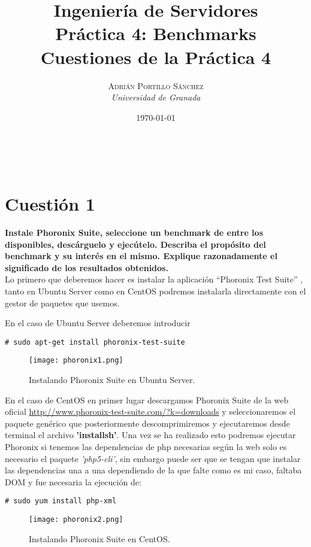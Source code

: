 \documentclass[a4paper, 10pt]{article} %
\title{\textbf{Ingeniería de Servidores\\Práctica 4: Benchmarks}\\ %
\vspace{20 pt}
Cuestiones de la Práctica 4} %
\author{\textsc{Adrián Portillo Sánchez} %
\\{\textit{Universidad de Granada}}} %
\date{\today} %
\makeatletter
\renewcommand{\maketitle}{ %
\begin{center} %
{\Huge\@title} %
\end{center}

\vspace{20pt} %

\begin{flushright} %
{\large\@author} %
\\\@date %

\vspace{40pt} %
\end{flushright}
\renewcommand{\baselinestretch}{0.5}

}
\makeatother
\begin{document}
\thispagestyle{empty}
\maketitle
\pagebreak
\thispagestyle{empty}
\tableofcontents
\pagebreak
\listoffigures
\pagebreak

\section{Cuestión 1}
\textbf{Instale Phoronix Suite, seleccione un benchmark de entre los disponibles, descárguelo y ejecútelo. Describa el propósito del benchmark y su interés en el mismo. Explique razonadamente el significado de los resultados obtenidos.}\\

Lo primero que deberemos hacer es instalar la aplicación “Phoronix Test Suite” \cite{1}, tanto en Ubuntu Server como en CentOS podremos instalarla directamente con el gestor de paquetes que usemos.

En el caso de Ubuntu Server deberemos introducir
\begin{verbatim}
# sudo apt-get install phoronix-test-suite
\end{verbatim}

\begin{figure}[H]
\centering 
\texttt{[image: phoronix1.png]} 
\caption{Instalando Phoronix Suite en Ubuntu Server.} 
\label{contexto:figura} 
\end{figure}

En el caso de CentOS en primer lugar descargamos Phoronix Suite de la web oficial \url{http://www.phoronix-test-suite.com/?k=downloads} y seleccionaremos el paquete
genérico que posteriormente descomprimiremos y ejecutaremos desde terminal el archivo \textbf{'installsh'}.
Una vez se ha realizado esto podremos ejecutar Phoronix si tenemos las dependencias de
php necesarias según la web solo es necesario el paquete \textit{'php5-cli'}, sin embargo puede ser que
se tengan que instalar las dependencias una a una dependiendo de la que falte como es mi caso, faltaba DOM y fue necesaria la ejecución de:
\begin{verbatim}
# sudo yum install php-xml
\end{verbatim}

\begin{figure}[H]
\centering 
\texttt{[image: phoronix2.png]} 
\caption{Instalando Phoronix Suite en CentOS.} 
\label{contexto:figura} 
\end{figure}
\end{document}
